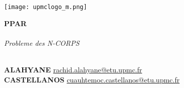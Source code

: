\begin{titlepage}
  \begin{flushleft}
    \vspace{3mm}
    \texttt{[image: upmclogo\_m.png]}\\
  \end{flushleft}
  \vfil
  \vfil
  \begin{center}
    \Huge\textbf{{PPAR}}\\
    \hrulefill\\
    \Huge\textit{{Probleme des N-CORPS}}\\
  \end{center}
  \hrulefill\\
  \vfil
  \noindent \textbf{ALAHYANE} 
  \hfill 
  \href{mailto:rachid.alahyane@etu.upmc.fr}{rachid.alahyane@etu.upmc.fr}\\ 
  \textbf{CASTELLANOS} 
  \hfill 
  \href{mailto:cuauhtemoc.castellanos@etu.upmc.fr}{cuauhtemoc.castellanos@etu.upmc.fr}\\
  \vfil
  \begin{center}	
  \end{center}
\end{titlepage}




